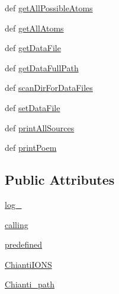 \begin{DoxyCompactItemize}
def \hyperlink{classpyneb_1_1utils_1_1manage__atomic__data_1_1___manage_atomic_data_a61c4fe67cd361ade800f01f48ea90ad0}{get\-All\-Possible\-Atoms}
\item 
def \hyperlink{classpyneb_1_1utils_1_1manage__atomic__data_1_1___manage_atomic_data_a6e4f6d5890cfb5e3371b46c319c67f53}{get\-All\-Atoms}
\item 
def \hyperlink{classpyneb_1_1utils_1_1manage__atomic__data_1_1___manage_atomic_data_a289b3ad01e359e3550b2384362c36990}{get\-Data\-File}
\item 
def \hyperlink{classpyneb_1_1utils_1_1manage__atomic__data_1_1___manage_atomic_data_ac8f4b782b3aee9491aa3542fd933bd52}{get\-Data\-Full\-Path}
\item 
def \hyperlink{classpyneb_1_1utils_1_1manage__atomic__data_1_1___manage_atomic_data_a065ac21e98ec49b6f9695c075dbde415}{scan\-Dir\-For\-Data\-Files}
\item 
def \hyperlink{classpyneb_1_1utils_1_1manage__atomic__data_1_1___manage_atomic_data_a76ee45cb9b8a5ead8cd716ebc0facf92}{set\-Data\-File}
\item 
def \hyperlink{classpyneb_1_1utils_1_1manage__atomic__data_1_1___manage_atomic_data_a17f7d0a39484aa363bd2814ffbee2855}{print\-All\-Sources}
\item 
def \hyperlink{classpyneb_1_1utils_1_1manage__atomic__data_1_1___manage_atomic_data_a780a8f85e8acf64b44b2bce4b4292386}{print\-Poem}
\end{DoxyCompactItemize}
\subsection*{Public Attributes}
\begin{DoxyCompactItemize}
\item 
\hyperlink{classpyneb_1_1utils_1_1manage__atomic__data_1_1___manage_atomic_data_a1d8277ab92e8bac3e52ade094ba63773}{log\-\_\-}
\item 
\hyperlink{classpyneb_1_1utils_1_1manage__atomic__data_1_1___manage_atomic_data_ab10b91ca784741ce7af163d010802434}{calling}
\item 
\hyperlink{classpyneb_1_1utils_1_1manage__atomic__data_1_1___manage_atomic_data_a42d17444c105bd5238ae202a722ecb47}{predefined}
\item 
\hyperlink{classpyneb_1_1utils_1_1manage__atomic__data_1_1___manage_atomic_data_a06491f5f808df3d4e58b35e09db74a18}{Chianti\-I\-O\-N\-S}
\item 
\hyperlink{classpyneb_1_1utils_1_1manage__atomic__data_1_1___manage_atomic_data_a898e51085e3461333ea9df3a3fce3599}{Chianti\-\_\-path}
\end{DoxyCompactItemize}
